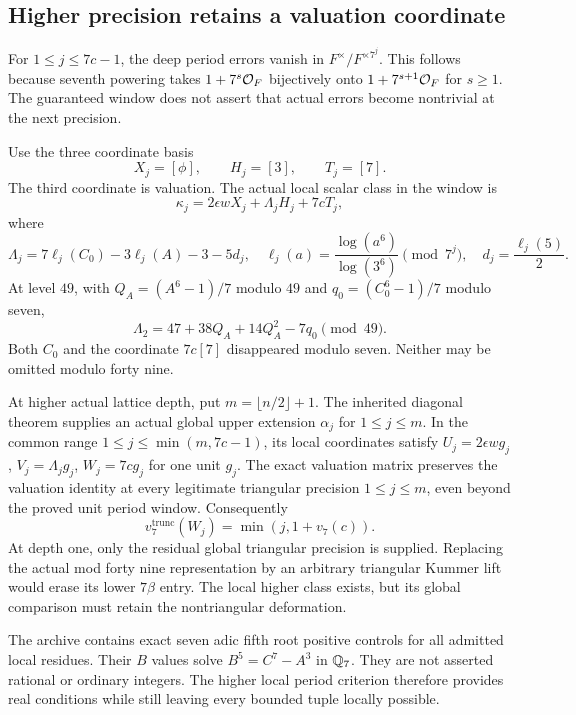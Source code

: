 \subsection{Higher precision retains a valuation coordinate}
For $1\le j\le7c-1$, the deep period errors vanish in $F^\times/F^{\times7^j}$. This follows because seventh powering takes $1+7^s\mathcal O_F$ bijectively onto $1+7^{s+1}\mathcal O_F$ for $s\ge1$. The guaranteed window does not assert that actual errors become nontrivial at the next precision.

Use the three coordinate basis
\[
X_j=[\phi],\qquad H_j=[3],\qquad T_j=[7].
\]
The third coordinate is valuation. The actual local scalar class in the window is
\begin{equation}\label{eq:higherkappa}
\kappa_j=2\epsilon wX_j+\Lambda_jH_j+7cT_j,
\end{equation}
where
\[
\Lambda_j=7\ell_j(C_0)-3\ell_j(A)-3-5d_j,
\quad \ell_j(a)=\frac{\log(a^6)}{\log(3^6)}\pmod{7^j},
\quad d_j=\frac{\ell_j(5)}2.
\]
At level $49$, with $Q_A=(A^6-1)/7$ modulo $49$ and $q_0=(C_0^6-1)/7$ modulo seven,
\begin{equation}\label{eq:level49}
\Lambda_2=47+38Q_A+14Q_A^2-7q_0\pmod{49}.
\end{equation}
Both $C_0$ and the coordinate $7c[7]$ disappeared modulo seven. Neither may be omitted modulo forty nine.

At higher actual lattice depth, put $m=\lfloor n/2\rfloor+1$. The inherited diagonal theorem supplies an actual global upper extension $\alpha_j$ for $1\le j\le m$. In the common range $1\le j\le\min(m,7c-1)$, its local coordinates satisfy $U_j=2\epsilon wg_j$, $V_j=\Lambda_jg_j$, $W_j=7cg_j$ for one unit $g_j$. The exact valuation matrix preserves the valuation identity at every legitimate triangular precision $1\le j\le m$, even beyond the proved unit period window. Consequently
\[
v_7^{\mathrm{trunc}}(W_j)=\min(j,1+v_7(c)).
\]
At depth one, only the residual global triangular precision is supplied. Replacing the actual mod forty nine representation by an arbitrary triangular Kummer lift would erase its lower $7\beta$ entry. The local higher class exists, but its global comparison must retain the nontriangular deformation.

The archive contains exact seven adic fifth root positive controls for all admitted local residues. Their $B$ values solve $B^5=C^7-A^3$ in $\mathbb Q_7$. They are not asserted rational or ordinary integers. The higher local period criterion therefore provides real conditions while still leaving every bounded tuple locally possible.
